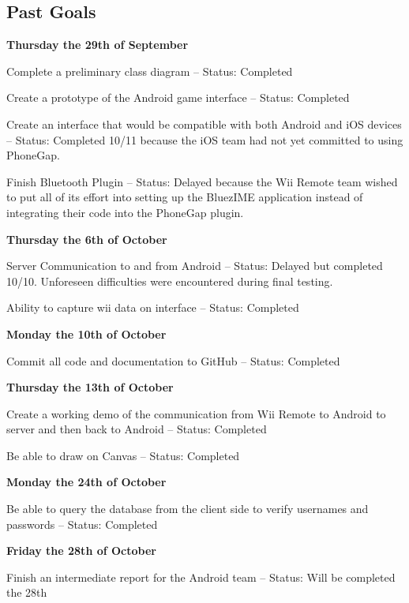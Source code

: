 \documentclass[12pt]{article}
\newenvironment{itemize*}%
  {\begin{itemize}%
  	\setlength{\parsep}{0pt}
    \setlength{\itemsep}{0pt}%
    \setlength{\parskip}{0pt}}%
  {\end{itemize}}
\begin{document}
\subsection{Past Goals}
\textbf{Thursday the 29th of September}
\begin{itemize*}
\item Complete a preliminary class diagram – Status: Completed
\item Create a prototype of the Android game interface – Status: Completed
\item Create an interface that would be compatible with both Android and iOS devices – Status: Completed 10/11 because the iOS team had not yet committed to using PhoneGap.
\item Finish Bluetooth Plugin – Status: Delayed because the Wii Remote team wished to put all of its effort into setting up the BluezIME application instead of integrating their code into the PhoneGap plugin. 
\end{itemize*}
\textbf{Thursday the 6th of October}
\begin{itemize*}
\item Server Communication to and from Android – Status: Delayed but completed 10/10.  Unforeseen difficulties were encountered during final testing.
\item Ability to capture wii data on interface – Status: Completed
\end{itemize*}
\textbf{Monday the 10th of October}
\begin{itemize*}
\item Commit all code and documentation to GitHub – Status: Completed
\end{itemize*}
\textbf{Thursday the 13th of October}
\begin{itemize*}
\item Create a working demo of the communication from Wii Remote to Android to server and then back to Android – Status: Completed
\item Be able to draw on Canvas – Status: Completed
\end{itemize*}
\textbf{Monday the 24th of October}
\begin{itemize*}
\item Be able to query the database from the client side to verify usernames and passwords – Status: Completed
\end{itemize*}
\textbf{Friday the 28th of October}
\begin{itemize*}
\item Finish an intermediate report for the Android team – Status: Will be completed the 28th
\end{itemize*}
\end{document}

